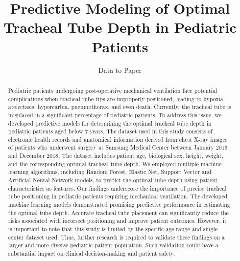 \documentclass[11pt]{article}
\title{Predictive Modeling of Optimal Tracheal Tube Depth in Pediatric Patients}
\author{Data to Paper}
\begin{document}
\maketitle
\begin{abstract}
Pediatric patients undergoing post-operative mechanical ventilation face potential complications when tracheal tube tips are improperly positioned, leading to hypoxia, atelectasis, hypercarbia, pneumothorax, and even death. Currently, the tracheal tube is misplaced in a significant percentage of pediatric patients. To address this issue, we developed predictive models for determining the optimal tracheal tube depth in pediatric patients aged below 7 years. The dataset used in this study consists of electronic health records and anatomical information derived from chest X-ray images of patients who underwent surgery at Samsung Medical Center between January 2015 and December 2018. The dataset includes patient age, biological sex, height, weight, and the corresponding optimal tracheal tube depth. We employed multiple machine learning algorithms, including Random Forest, Elastic Net, Support Vector and Artificial Neural Network models, to predict the optimal tube depth using patient characteristics as features. Our findings underscore the importance of precise tracheal tube positioning in pediatric patients requiring mechanical ventilation. The developed machine learning models demonstrated promising predictive performance in estimating the optimal tube depth. Accurate tracheal tube placement can significantly reduce the risks associated with incorrect positioning and improve patient outcomes. However, it is important to note that this study is limited by the specific age range and single-center dataset used. Thus, further research is required to validate these findings on a larger and more diverse pediatric patient population. Such validation could have a substantial impact on clinical decision-making and patient safety.
\end{abstract}
\end{document}
